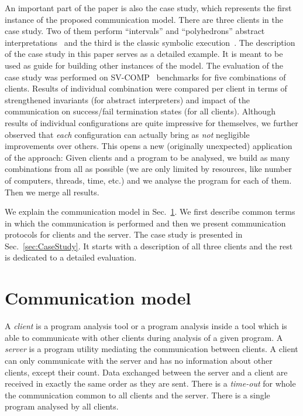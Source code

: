 \documentclass[envcountsame]{llncs}
\begin{document}
An important part of the paper is also the case study, which represents the
first instance of the proposed communication model. There are three clients in
the case study. Two of them perform ``intervals'' and ``polyhedrons'' abstract
interpretations~\cite{AI_CousotCousot77} and the third is the classic symbolic
execution~\cite{SE_King76}. The description of the case study in this paper
serves as a detailed example. It is meant to be used as guide for building other
instances of the model. The evaluation of the case study was performed on
SV-COMP~\cite{SVCOMPURL} benchmarks for five combinations of clients. Results of
individual combination were compared per client in terms of strengthened
invariants (for abstract interpreters) and impact of the communication on
success/fail termination states (for all clients). Although results of
individual configurations are quite impressive for themselves, we further
observed that \emph{each} configuration can actually bring as \emph{not}
negligible improvements over others. This opens a new (originally unexpected)
application of the approach: Given  clients and a program to be
analysed, we build as many combinations from all  as possible (we are
only limited by resources, like number of computers, threads, time, etc.) and we
analyse the program for each of them. Then we merge all results.

We explain the communication model in Sec.~\ref{sec:Communication}. We first
describe common terms in which the communication is performed and then we
present communication protocols for clients and the server. The case study is
presented in Sec.~\ref{sec:CaseStudy}. It starts with a description of all three
clients and the rest is dedicated to a detailed evaluation.

\section{Communication model}
\label{sec:Communication}

A \emph{client} is a program analysis tool or a program analysis inside a tool
which is able to  communicate with other clients during analysis of a given
program. A \emph{server} is a program utility mediating the communication
between clients. A client can only communicate with the server and has no
information about other clients, except their count. Data exchanged between the
server and a client are received in exactly the same order as they are sent.
There is a \emph{time-out} for whole the communication common to all clients and
the server. There is a single program analysed by all clients.
\end{document}
